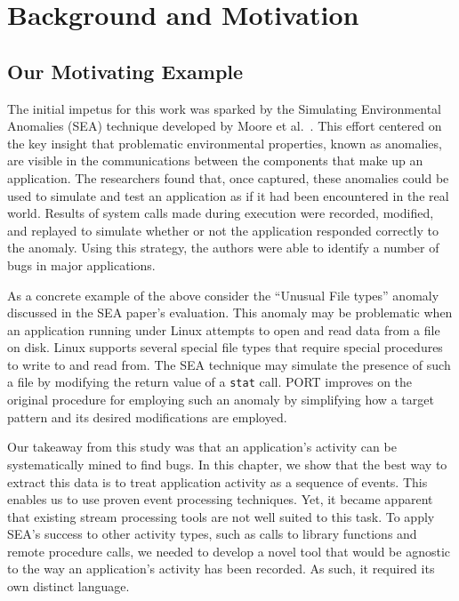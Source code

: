 \section{Background and Motivation}
\label{sec:PORTbackground}


\subsection{Our Motivating Example}
\label{sec:MotivatingExample}

The initial impetus for this work was sparked by the Simulating Environmental Anomalies (SEA) technique developed by Moore et al.~\cite{DBLP:conf/issre/MooreCFW19}.
This effort centered on the key insight
that problematic
environmental properties,
known as anomalies, are visible in the
communications between the components that make up an application.
The researchers found that,
once captured,
these anomalies
could be
used to simulate and
test
an application as if
it had been encountered
in the real world.
Results of system calls made
during execution were recorded, modified, and replayed to simulate whether or not the application
responded correctly to the anomaly.
Using this strategy, the authors were able to identify a number of bugs
in major applications.

As a concrete example of the above
consider the ``Unusual File types'' anomaly
discussed in the SEA paper's evaluation.
This anomaly may be problematic
when an application running under Linux
attempts to open and read data from a file on disk.
Linux supports several special file types  that require special procedures to
write to and
read from.
The SEA technique
may simulate the presence of such a file by
modifying
the return value
of a {\tt stat} call.
PORT improves on the original procedure for employing such an anomaly
by simplifying how a target pattern
and its desired modifications are employed.

Our takeaway
from this study
was that an application's activity
can be systematically mined to find bugs.
In this chapter, we
show that the best way to extract this data
is to treat application activity
as a sequence of events. This enables us to use
proven event processing techniques.
Yet, it became apparent that existing
stream processing tools
are not well suited to this task. To apply
SEA's success to other activity types,
such as calls to library functions
and remote procedure calls, we needed to develop a novel tool that would be  agnostic to the way an application's activity has been recorded. As such, it required its own  distinct language.


